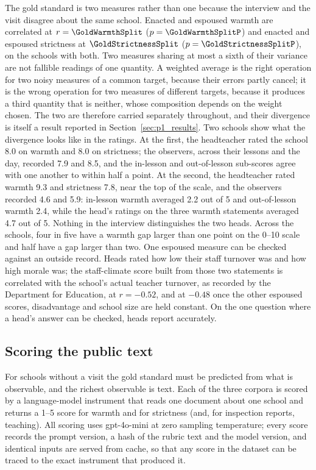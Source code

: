 The gold standard is two measures rather than one because the interview and
the visit disagree about the same school. Enacted and espoused warmth are
correlated at $r = \GoldWarmthSplit$ ($p = \GoldWarmthSplitP$) and enacted and
espoused strictness at $\GoldStrictnessSplit$ ($p = \GoldStrictnessSplitP$),
on the \NTierOne{} schools with both. Two measures sharing at most a sixth of
their variance are not fallible readings of one quantity. A weighted average
is the right operation for two noisy measures of a common target, because
their errors partly cancel; it is the wrong operation for two measures of
different targets, because it produces a third quantity that is neither,
whose composition depends on the weight chosen. The two are therefore carried
separately throughout, and their divergence is itself a result reported in
Section~\ref{sec:p1_results}. Two schools show what the divergence looks like
in the ratings. At the first, the headteacher rated the school 8.0 on warmth
and 8.0 on strictness; the observers, across their lessons and the day,
recorded 7.9 and 8.5, and the in-lesson and out-of-lesson sub-scores agree
with one another to within half a point. At the second, the headteacher rated
warmth 9.3 and strictness 7.8, near the top of the scale, and the observers
recorded 4.6 and 5.9: in-lesson warmth averaged 2.2 out of 5 and out-of-lesson
warmth 2.4, while the head's ratings on the three warmth statements averaged
4.7 out of 5. Nothing in the interview distinguishes the two heads. Across the
\NTierOne{} schools, four in five have a warmth gap larger than one point on
the 0--10 scale and half have a gap larger than two. One espoused measure can
be checked against an outside record. Heads rated how low their staff
turnover was and how high morale was; the staff-climate score built from
those two statements is correlated with the school's actual teacher turnover,
as recorded by the Department for Education, at $r = -0.52$, and at $-0.48$
once the other espoused scores, disadvantage and school size are held
constant. On the one question where a head's answer can be checked, heads
report accurately.

\subsection{Scoring the public text}

For schools without a visit the gold standard must be predicted from what is
observable, and the richest observable is text. Each of the three corpora is
scored by a language-model instrument that reads one document about one
school and returns a 1--5 score for warmth and for strictness (and, for
inspection reports, teaching). All scoring uses gpt-4o-mini at zero
sampling temperature; every score records the prompt version, a hash of the
rubric text and the model version, and identical inputs are served from
cache, so that any score in the dataset can be traced to the exact instrument
that produced it.

